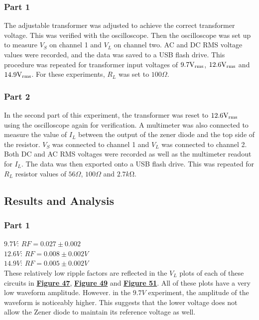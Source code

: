 \documentclass[
	letterpaper
	12pt
]{template}
\newcommand{\bref}[2]{\textbf{\hyperref[#1]{#2}}}
\begin{document}
\subsubsection{Part 1}\label{method::F1}
The adjustable transformer was adjusted to achieve the correct transformer voltage. This was verified with the oscilloscope. Then the oscilloscope was set up to measure $V_S$ on channel 1 and $V_L$ on channel two. AC and DC RMS voltage values were recorded, and the data was saved to a USB flash drive. This procedure was repeated for transformer input voltages of $9.7\unit{\volt}_{\rm rms}$, $12.6\unit{\volt}_{\rm rms}$ and $14.9\unit{\volt}_{\rm rms}$. For these experiments, $R_L$ was set to $100\Omega$.
\subsubsection{Part 2}\label{method::F2}
In the second part of this experiment, the transformer was reset to $12.6\unit{\volt}_{\rm rms}$ using the oscilloscope again for verification. A multimeter was also connected to measure the value of $I_L$ between the output of the zener diode and the top side of the resistor. $V_S$ was connected to channel 1 and $V_L$ was connected to channel 2. Both DC and AC RMS voltages were recorded as well as the multimeter readout for $I_L$. The data was then exported onto a USB flash drive. This was repeated for $R_L$ resistor values of $56\Omega$, $100\Omega$ and $2.7\unit{k\ohm}$.

\subsection{Results and Analysis}
\subsubsection{Part 1}

$9.7\unit{V}$:  $RF=0.027\pm 0.002$\\
$12.6\unit{V}$: $RF=0.008\pm 0.002\unit{V}$\\
$14.9\unit{V}$: $RF=0.005\pm 0.002\unit{V}$\\

These relatively low ripple factors are reflected in the $V_L$ plots of each of these circuits in \bref{data::F}{Figure 47}, \bref{data::F}{Figure 49} and \bref{data::F}{Figure 51}. All of these plots have a very low waveform amplitude. However. in the $9.7\unit{V}$ experiment, the amplitude of the waveform is noticeably higher. This suggests that the lower voltage does not allow the Zener diode to maintain its reference voltage as well.
\end{document}
